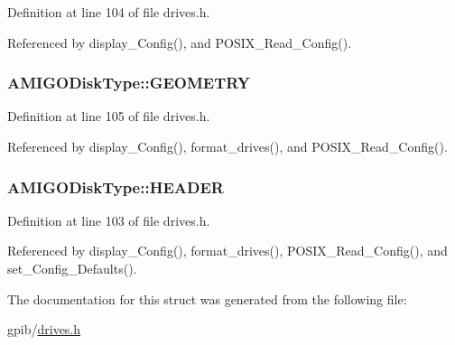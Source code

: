 Definition at line 104 of file drives.\+h.



Referenced by display\+\_\+\+Config(), and P\+O\+S\+I\+X\+\_\+\+Read\+\_\+\+Config().

\subsubsection[{\texorpdfstring{G\+E\+O\+M\+E\+T\+RY}{GEOMETRY}}]{ A\+M\+I\+G\+O\+Disk\+Type\+::\+G\+E\+O\+M\+E\+T\+RY}\hypertarget{structAMIGODiskType_aa75cfbfabf8081ff7bca08cf87af4da8}{}\label{structAMIGODiskType_aa75cfbfabf8081ff7bca08cf87af4da8}


Definition at line 105 of file drives.\+h.



Referenced by display\+\_\+\+Config(), format\+\_\+drives(), and P\+O\+S\+I\+X\+\_\+\+Read\+\_\+\+Config().

\subsubsection[{\texorpdfstring{H\+E\+A\+D\+ER}{HEADER}}]{ A\+M\+I\+G\+O\+Disk\+Type\+::\+H\+E\+A\+D\+ER}\hypertarget{structAMIGODiskType_a9814efe6f564b104fc7e0100231908a8}{}\label{structAMIGODiskType_a9814efe6f564b104fc7e0100231908a8}


Definition at line 103 of file drives.\+h.



Referenced by display\+\_\+\+Config(), format\+\_\+drives(), P\+O\+S\+I\+X\+\_\+\+Read\+\_\+\+Config(), and set\+\_\+\+Config\+\_\+\+Defaults().



The documentation for this struct was generated from the following file\+:\begin{DoxyCompactItemize}
\item 
gpib/\hyperlink{drives_8h}{drives.\+h}\end{DoxyCompactItemize}
